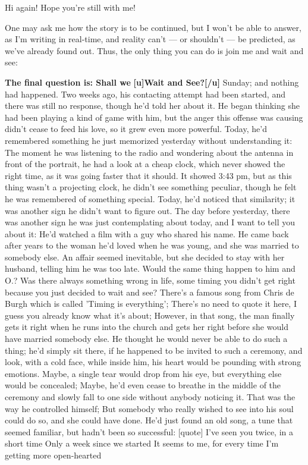 Hi again! Hope you're still with me!

One may ask me how the story is to be continued, but I won't be able to answer, as I'm writing in real-time, and reality can't --- or shouldn't --- be predicted, as we've already found out. Thus, the only thing you can do is join me and wait and see: 

\textbf{The final question is: Shall we}
\textbf{[u]Wait and See?[/u]}
Sunday; and nothing had happened. Two weeks ago, his contacting attempt had been started, and there was still no response, though he'd told her about it. He began thinking she had been playing a kind of game with him, but the anger this offense was causing didn't cease to feed his love, so it grew even more powerful. 
Today, he'd remembered something he just memorized yesterday without understanding it: The moment he was listening to the radio and wondering about the antenna in front of the portrait, he had a look at a cheap clock, which never showed the right time, as it was going faster that it should. 
It showed 3:43 pm, but as this thing wasn't a projecting clock, he didn't see something peculiar, though he felt he was remembered of something special. 
Today, he'd noticed that similarity; it was another sign he didn't want to figure out. 
The day before yesterday, there was another sign he was just contemplating about today, and I want to tell you about it: He'd watched a film with a guy who shared his name. He came back after years to the woman he'd loved when he was young, and she was married to somebody else. An affair seemed inevitable, but she decided to stay with her husband, telling him he was too late. 
Would the same thing happen to him and O.?
Was there always something wrong in life, some timing you didn't get right because you just decided to wait and see?
There's a famous song from Chris de Burgh which is called 'Timing is everything'; There's no need to quote it here, I guess you already know what it's about; However, in that song, the man finally gets it right when he runs into the church and gets her right before she would have married somebody else. 
He thought he would never be able to do such a thing; he'd simply sit there, if he happened to be invited to such a ceremony, and look, with a cold face, while inside him, his heart would be pounding with strong emotions. Maybe, a single tear would drop from his eye, but everything else would be concealed; Maybe, he'd even cease to breathe in the middle of the ceremony and slowly fall to one side without anybody noticing it. That was the way he controlled himself; But somebody who really wished to see into his soul could do so, and she could have done. 
He'd just found an old song, a tune that seemed familiar, but hadn't been so successful:
[quote]
I've seen you twice, in a short time 
Only a week since we started 
It seems to me, for every time 
I'm getting more open-hearted 
 
